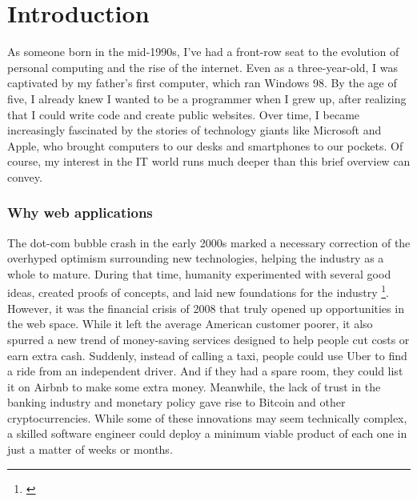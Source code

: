 \chapter*{Introduction}
\par
As someone born in the mid-1990s, I've had a front-row seat to the evolution of personal computing and the rise of the internet. Even as a three-year-old, I was captivated by my father's first computer, which ran Windows 98. By the age of five, I already knew I wanted to be a programmer when I grew up, after realizing that I could write code and create public websites. Over time, I became increasingly fascinated by the stories of technology giants like Microsoft and Apple, who brought computers to our desks and smartphones to our pockets. Of course, my interest in the IT world runs much deeper than this brief overview can convey.
\subsection*{Why web applications}
\par
The dot-com bubble crash in the early 2000s marked a necessary correction of the overhyped optimism surrounding new technologies, helping the industry as a whole to mature. During that time, humanity experimented with several good ideas, created proofs of concepts, and laid new foundations for the industry \footnote{\cite{RFDis}}. However, it was the financial crisis of 2008 that truly opened up opportunities in the web space. While it left the average American customer poorer, it also spurred a new trend of money-saving services designed to help people cut costs or earn extra cash. Suddenly, instead of calling a taxi, people could use Uber to find a ride from an independent driver. And if they had a spare room, they could list it on Airbnb to make some extra money. Meanwhile, the lack of trust in the banking industry and monetary policy gave rise to Bitcoin and other cryptocurrencies. While some of these innovations may seem technically complex, a skilled software engineer could deploy a minimum viable product of each one in just a matter of weeks or months.
